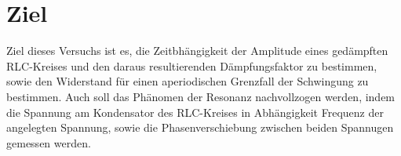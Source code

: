 \section{Ziel}
\label{sec:Ziel}
Ziel dieses Versuchs ist es, die Zeitbhängigkeit der Amplitude eines
gedämpften RLC-Kreises und den daraus resultierenden Dämpfungsfaktor
zu bestimmen, sowie den Widerstand für einen aperiodischen Grenzfall der Schwingung
 zu bestimmen. Auch soll das Phänomen der Resonanz nachvollzogen werden, indem
 die Spannung am Kondensator des RLC-Kreises in Abhängigkeit Frequenz der angelegten
 Spannung, sowie die Phasenverschiebung zwischen beiden Spannugen gemessen
 werden.
